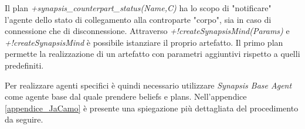 Il plan \textit{+synapsis\_counterpart\_status(Name,C)} ha lo scopo di "notificare" l'agente dello stato di collegamento alla controparte "corpo", sia in caso di connessione che di disconnessione. Attraverso \textit{+!createSynapsisMind(Params)} e \textit{+!createSynapsisMind} è possibile istanziare il proprio artefatto. Il primo plan permette la realizzazione di un artefatto con parametri aggiuntivi rispetto a quelli predefiniti.

\medskip

Per realizzare agenti specifici è quindi necessario utilizzare \textit{Synapsis Base Agent} come agente base dal quale prendere beliefs e plans. Nell'appendice \ref{appendice_JaCamo} è presente una spiegazione più dettagliata del procedimento da seguire.


